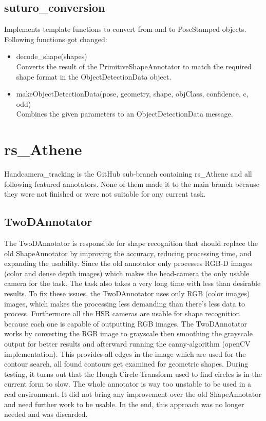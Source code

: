 \documentclass[main.tex]{subfiles}
\begin{document}
\subsection{suturo\_conversion}
Implements template functions to convert from and to PoseStamped objects.
Following functions got changed:

\begin{itemize}
\item decode\_shape(shapes)\\
Converts the result of the PrimitiveShapeAnnotator to match the required shape format in the ObjectDetectionData object.

\item makeObjectDetectionData(pose, geometry, shape, objClass, confidence, c, odd)\\
Combines the given parameters to an ObjectDetectionData message.
\end{itemize}

			\section{rs\_Athene}
Handcamera\_tracking is the GitHub sub-branch containing rs\_Athene and all following featured annotators. 
None of them made it to the main branch because they were not finished or were not suitable for any current task.

				\subsection{TwoDAnnotator}
The TwoDAnnotator is responsible for shape recognition that should replace the old ShapeAnnotator by improving the accuracy, reducing processing time, and expanding the usability. 
Since the old annotator only processes RGB-D images (color and dense depth images) which makes the head-camera the only usable camera for the task. The task also takes a very long time with less than desirable results.
To fix these issues, the TwoDAnnotator uses only RGB (color images) images, which makes the processing less demanding than there's less data to process. Furthermore all the HSR cameras are usable for shape recognition because each one is capable of outputting RGB images.
The TwoDAnnotator works by converting the RGB image to grayscale then smoothing the grayscale output for better results and afterward running the canny-algorithm (openCV implementation). This provides all edges in the image which are used for the contour search, all found contours get examined for geometric shapes. 
During testing, it turns out that the Hough Circle Transform used to find circles is in the current form to slow. The whole annotator is way too unstable to be used in a real environment. It did not bring any improvement over the old ShapeAnnotator and need further work to be usable. 
In the end, this approach was no longer needed and was discarded. 
\end{document}
